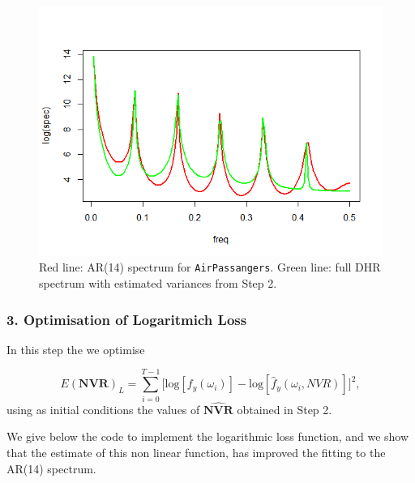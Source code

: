\documentclass{article}\usepackage[]{graphicx}\usepackage[]{color}
\begin{document}
\begin{figure}[htbp]
\centering
\includegraphics[scale = 0.4]{Plots/firstestimateDHR.png}
\caption{Red line: AR(14) spectrum for \texttt{AirPassangers}. Green line: full DHR spectrum with estimated variances from Step 2.}
\label{fig:firstestimateDHR}
\end{figure}


\subsubsection*{3. Optimisation of Logaritmich Loss}
In this step the we optimise 

\begin{equation*}
E(\mathbf{NVR})_{L} = \sum_{i = 0}^{T - 1} \Big[ \text{log}[f_y(\omega_i)] - \text{log}[\hat{f}_y(\omega_i, NVR)] \Big]^2,
\end{equation*}
using as initial conditions the values of $\widehat{\mathbf{NVR}}$ obtained in Step 2.

We give below the code to implement the logarithmic loss function, and we show that the estimate of this non linear function, has improved the fitting to the AR(14) spectrum. 
\end{document}
